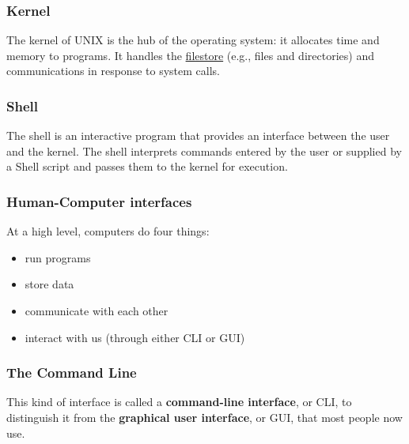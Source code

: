 \documentclass[
  letterpaper,
  DIV=11,
  numbers=noendperiod]{scrreprt}
\providecommand{\tightlist}{%
  \setlength{\itemsep}{0pt}\setlength{\parskip}{0pt}}\usepackage{longtable,booktabs,array}
\begin{document}
\hypertarget{kernel}{%
\subsubsection*{Kernel}\label{kernel}}

The kernel of UNIX is the hub of the operating system: it allocates time
and memory to programs. It handles the
\href{http://users.ox.ac.uk/~martinw/unix/chap3.html}{filestore} (e.g.,
files and directories) and communications in response to system calls.

\hypertarget{shell}{%
\subsubsection*{Shell}\label{shell}}

The shell is an interactive program that provides an interface between
the user and the kernel. The shell interprets commands entered by the
user or supplied by a Shell script and passes them to the kernel for
execution.

\hypertarget{human-computer-interfaces}{%
\subsubsection*{Human-Computer
interfaces}\label{human-computer-interfaces}}

At a high level, computers do four things:

\begin{itemize}
\tightlist
\item
  run programs
\item
  store data
\item
  communicate with each other
\item
  interact with us (through either CLI or GUI)
\end{itemize}

\hypertarget{the-command-line-1}{%
\subsubsection*{The Command Line}\label{the-command-line-1}}

This kind of interface is called a \textbf{command-line interface}, or
CLI, to distinguish it from the \textbf{graphical user interface}, or
GUI, that most people now use.
\end{document}
